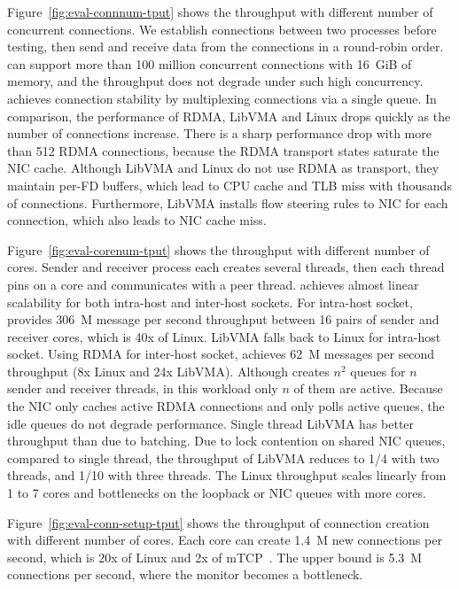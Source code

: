 Figure~\ref{fig:eval-connnum-tput} shows the throughput with different number of concurrent connections.
We establish connections between two processes before testing, then send and receive data from the connections in a round-robin order.
\sys can support more than 100 million concurrent connections with 16~GiB of memory, and the throughput does not degrade under such high concurrency.
\sys achieves connection stability by multiplexing connections via a single queue.
In comparison, the performance of RDMA, LibVMA and Linux drops quickly as the number of connections increase. There is a sharp performance drop with more than 512 RDMA connections, because the RDMA transport states saturate the NIC cache. Although LibVMA and Linux do not use RDMA as transport, they maintain per-FD buffers, which lead to CPU cache and TLB miss with thousands of connections. Furthermore, LibVMA installs flow steering rules to NIC for each connection, which also leads to NIC cache miss.




Figure~\ref{fig:eval-corenum-tput} shows the throughput with different number of cores.
Sender and receiver process each creates several threads, then each thread pins on a core and communicates with a peer thread.
\sys achieves almost linear scalability for both intra-host and inter-host sockets.
For intra-host socket, \sys provides 306~M message per second throughput between 16 pairs of sender and receiver cores, which is 40x of Linux.
LibVMA falls back to Linux for intra-host socket.
Using RDMA for inter-host socket, \sys achieves 62~M messages per second throughput (8x Linux and 24x LibVMA).
Although \sys{} creates $n^2$ queues for $n$ sender and receiver threads, in this workload only $n$ of them are active.
Because the NIC only caches active RDMA connections and \libipc{} only polls active queues, the idle queues do not degrade performance.
Single thread LibVMA has better throughput than \sys due to batching.
Due to lock contention on shared NIC queues, compared to single thread, the throughput of LibVMA reduces to 1/4 with two threads, and 1/10 with three threads.
The Linux throughput scales linearly from 1 to 7 cores and bottlenecks on the loopback or NIC queues with more cores.

Figure~\ref{fig:eval-conn-setup-tput} shows the throughput of connection creation with different number of cores. Each core can create 1.4~M new connections per second, which is 20x of Linux and 2x of mTCP~\cite{jeong2014mtcp}. The upper bound is 5.3~M connections per second, where the monitor becomes a bottleneck.


